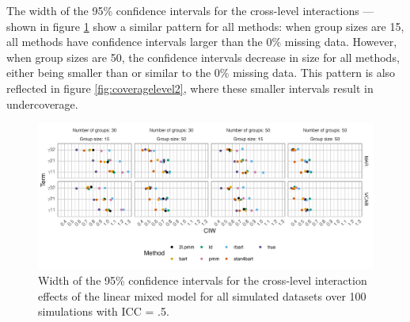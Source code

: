 \documentclass[10pt, a4paper, titlepage]{article}
\begin{document}
The width of the 95\% confidence intervals for the cross-level interactions --- shown in figure \ref{fig:ciwcrosslevel} show a similar pattern for all methods: when group sizes are 15, all methods have confidence intervals larger than the 0\% missing data. However, when group sizes are 50, the confidence intervals decrease in size for all methods, either being smaller than or similar to the 0\% missing data. This pattern is also reflected in figure \ref{fig:coveragelevel2}, where these smaller intervals result in undercoverage.




\begin{figure}[H]
    \centering
    \includegraphics[width=1\textwidth]{ciwcrosslevel.png}
    \caption{Width of the 95\% confidence intervals for the cross-level interaction effects of the linear mixed model for all simulated datasets over 100 simulations with ICC = .5.}
    \label{fig:ciwcrosslevel}
\end{figure}
\end{document}

